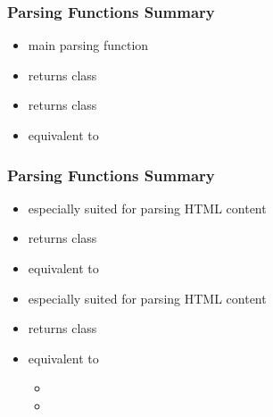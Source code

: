 \documentclass{beamer}\usepackage[]{graphicx}\usepackage[]{color}
\begin{document}

\begin{frame}[fragile]
\frametitle{Parsing Functions Summary}

\begin{block}{}
\begin{itemize}
 \item main parsing function
 \item returns class  
\end{itemize}
\end{block}

\begin{block}{}
\begin{itemize}
 \item returns class  
 \item equivalent to 
\end{itemize}
\end{block}

\end{frame}


\begin{frame}[fragile]
\frametitle{Parsing Functions Summary}

\begin{block}{}
\begin{itemize}
 \item especially suited for parsing HTML content
 \item returns class  
 \item equivalent to 
\end{itemize}
\end{block}

\begin{block}{}
\begin{itemize}
 \item especially suited for parsing HTML content
 \item returns class  
 \item equivalent to
 \begin{itemize}
  \item {}
  \item {}
 \end{itemize}
\end{itemize}
\end{block}

\end{frame}
\end{document}
